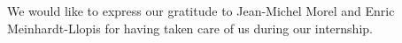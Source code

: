 
We would like to express our gratitude to Jean-Michel Morel and Enric Meinhardt-Llopis for having taken care of us during our internship.
